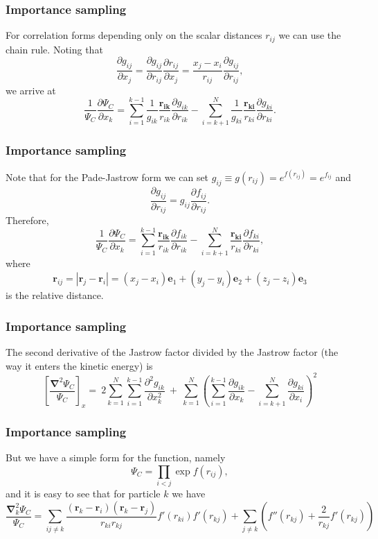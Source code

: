 \documentclass{beamer}
\begin{document}
\begin{frame}
\frametitle{Importance sampling}

For correlation forms depending only on the scalar distances $r_{ij}$ we can use the chain rule. Noting that 
\[
\frac{\partial g_{ij}}{\partial x_j} = \frac{\partial g_{ij}}{\partial r_{ij}} \frac{\partial r_{ij}}{\partial x_j} = \frac{x_j - x_i}{r_{ij}} \frac{\partial g_{ij}}{\partial r_{ij}},
\]
we arrive at
\[
\frac{1}{\Psi_C}\frac{\partial \Psi_C}{\partial x_k} = 
\sum_{i=1}^{k-1}\frac{1}{g_{ik}} \frac{\mathbf{r_{ik}}}{r_{ik}} \frac{\partial g_{ik}}{\partial r_{ik}}
-\sum_{i=k+1}^{N}\frac{1}{g_{ki}}\frac{\mathbf{r_{ki}}}{r_{ki}}\frac{\partial g_{ki}}{\partial r_{ki}}.
\]
\end{frame}

\begin{frame}
\frametitle{Importance sampling}

Note that for the Pade-Jastrow form we can set $g_{ij} \equiv g(r_{ij}) = e^{f(r_{ij})} = e^{f_{ij}}$ and 
\[
\frac{\partial g_{ij}}{\partial r_{ij}} = g_{ij} \frac{\partial f_{ij}}{\partial r_{ij}}.
\]
Therefore, 
\[
\frac{1}{\Psi_{C}}\frac{\partial \Psi_{C}}{\partial x_k} =
\sum_{i=1}^{k-1}\frac{\mathbf{r_{ik}}}{r_{ik}}\frac{\partial f_{ik}}{\partial r_{ik}}
-\sum_{i=k+1}^{N}\frac{\mathbf{r_{ki}}}{r_{ki}}\frac{\partial f_{ki}}{\partial r_{ki}},
\]
where 
\[
 \mathbf{r}_{ij} = |\mathbf{r}_j - \mathbf{r}_i| = (x_j - x_i)\mathbf{e}_1 + (y_j - y_i)\mathbf{e}_2 + (z_j - z_i)\mathbf{e}_3
\]
is the relative distance.
\end{frame}

\begin{frame}
\frametitle{Importance sampling}

The second derivative of the Jastrow factor divided by the Jastrow factor (the way it enters the kinetic energy) is
\[
\left[\frac{\mathbf{\nabla}^2 \Psi_C}{\Psi_C}\right]_x =\  
2\sum_{k=1}^{N}
\sum_{i=1}^{k-1}\frac{\partial^2 g_{ik}}{\partial x_k^2}\ +\ 
\sum_{k=1}^N
\left(
\sum_{i=1}^{k-1}\frac{\partial g_{ik}}{\partial x_k} -
\sum_{i=k+1}^{N}\frac{\partial g_{ki}}{\partial x_i}
\right)^2
\]
\end{frame}

\begin{frame}
\frametitle{Importance sampling}

But we have a simple form for the function, namely
\[
\Psi_{C}=\prod_{i< j}\exp{f(r_{ij})},
\]
and it is easy to see that for particle  $k$
we have
\[
  \frac{\mathbf{\nabla}^2_k \Psi_C}{\Psi_C }=
\sum_{ij\ne k}\frac{(\mathbf{r}_k-\mathbf{r}_i)(\mathbf{r}_k-\mathbf{r}_j)}{r_{ki}r_{kj}}f'(r_{ki})f'(r_{kj})+
\sum_{j\ne k}\left( f''(r_{kj})+\frac{2}{r_{kj}}f'(r_{kj})\right)
\]
\end{frame}
\end{document}
